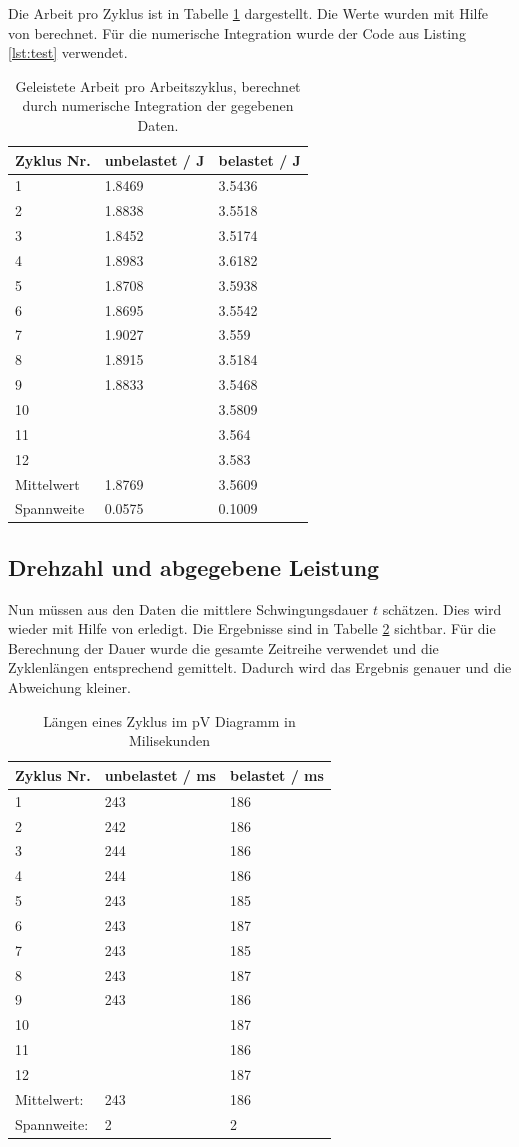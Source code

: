 \documentclass{article}
\begin{document}
Die Arbeit pro Zyklus ist in Tabelle \ref{tab:arbeit_pro_zykl} dargestellt. Die Werte wurden mit Hilfe von \cite{skript} berechnet. Für die numerische Integration wurde der Code aus Listing \ref{lst:test} verwendet. 
\begin{table}[H]
\caption{Geleistete Arbeit pro Arbeitszyklus, berechnet durch numerische Integration der gegebenen Daten.}
\label{tab:arbeit_pro_zykl}
\begin{tabular}{l|ll}
Zyklus Nr. & unbelastet / J & belastet / J \\
\hline
1 & 1.8469 & 3.5436 \\
2 & 1.8838 & 3.5518 \\
3 & 1.8452 & 3.5174 \\
4 & 1.8983 & 3.6182 \\
5 & 1.8708 & 3.5938 \\
6 & 1.8695 & 3.5542 \\
7 & 1.9027 & 3.559 \\
8 & 1.8915 & 3.5184 \\
9 & 1.8833 & 3.5468 \\
10 &  & 3.5809 \\
11 &  & 3.564 \\
12 &  & 3.583 \\
\hline
Mittelwert & 1.8769 & 3.5609 \\
Spannweite & 0.0575 & 0.1009
\end{tabular}
\end{table}


\subsection{Drehzahl und abgegebene Leistung}

Nun müssen aus den Daten die mittlere Schwingungsdauer $t$ schätzen. Dies wird wieder mit Hilfe von \cite{skript} erledigt. Die Ergebnisse sind in Tabelle \ref{tab:cycl_length} sichtbar. Für die Berechnung der Dauer wurde die gesamte Zeitreihe verwendet und die Zyklenlängen entsprechend gemittelt. Dadurch wird das Ergebnis genauer und die Abweichung kleiner.
\begin{table}[H]
\caption{Längen eines Zyklus im pV Diagramm in Milisekunden}
\label{tab:cycl_length}
\begin{tabular}{l|ll}
Zyklus Nr. & unbelastet / ms & belastet / ms \\
\hline 
1 & 243 & 186 \\
2 & 242 & 186 \\
3 & 244 & 186 \\
4 & 244 & 186 \\
5 & 243 & 185 \\
6 & 243 & 187 \\
7 & 243 & 185 \\
8 & 243 & 187 \\
9 & 243 & 186 \\
10 &  & 187 \\
11 &  & 186 \\
12 &  & 187 \\
\hline
Mittelwert: & 243 & 186 \\
Spannweite: & 2 & 2 
\end{tabular}
\end{table}
\end{document}
